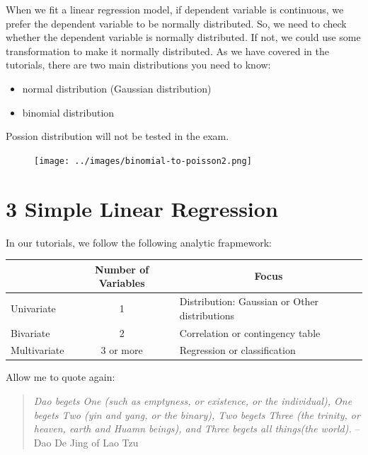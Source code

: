\documentclass[11pt]{article}
\theoremstyle{definition}
\providecommand{\tightlist}{%
\setlength{\itemsep}{0pt}\setlength{\parskip}{0pt}}
\begin{document}
When we fit a linear regression model, if dependent variable is continuous, 
we prefer the dependent variable to be normally distributed. 
So, we need to check whether the dependent variable is normally distributed. 
If not, we could use some transformation to make it normally distributed. 
As we have covered in the tutorials, there are two main distributions you need to know:

\begin{itemize}
  \tightlist 
  \item normal distribution (Gaussian distribution)
  \item binomial distribution
\end{itemize}

Possion distribution will not be tested in the exam.

\begin{figure}
  \centering
  \texttt{[image: ../images/binomial-to-poisson2.png]}
\end{figure}


\section{3 Simple Linear Regression}

In our tutorials, we follow the following analytic frapmework:


\begin{table}[!h]
  \centering
  \begin{tabular}{lcl}
    \toprule 
  \multicolumn{1}{l}{} & Number of Variables & \multicolumn{1}{c}{Focus}                     \\
  \hline 
  Univariate           & 1                   & Distribution: Gaussian or Other distributions \\
  Bivariate            & 2                   & Correlation or contingency table                          \\
  Multivariate         & 3 or more           & Regression or classification                          \\ 
  \hline                                          
  \end{tabular}
\end{table}

Allow me to quote again:

\begin{quote}
  \textit{Dao begets One (such as emptyness, or existence, or the individual),
  One begets Two (yin and yang, or the binary), Two begets Three (the trinity, or heaven, earth and Huamn
  beings), and Three begets all things(the world).} -- Dao De Jing of Lao Tzu
\end{quote}
\end{document}
